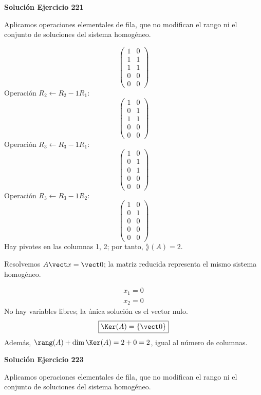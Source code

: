 \par\bigskip\noindent\textbf{Solución Ejercicio 221}\par\nobreak
Aplicamos operaciones elementales de fila, que no modifican el rango ni el conjunto de soluciones del sistema homogéneo.

\[
\begin{pmatrix}1&0\\1&1\\1&1\\0&0\\0&0\end{pmatrix}
\]
Operación $R_{2}\leftarrow R_{2}-1R_{1}$:
\[
\begin{pmatrix}1&0\\0&1\\1&1\\0&0\\0&0\end{pmatrix}
\]
Operación $R_{3}\leftarrow R_{3}-1R_{1}$:
\[
\begin{pmatrix}1&0\\0&1\\0&1\\0&0\\0&0\end{pmatrix}
\]
Operación $R_{3}\leftarrow R_{3}-1R_{2}$:
\[
\begin{pmatrix}1&0\\0&1\\0&0\\0&0\\0&0\end{pmatrix}
\]
Hay pivotes en las columnas 1, 2; por tanto, $\boxed{\rang(A)=2}$.

Resolvemos $A\vect x=\vect0$; la matriz reducida representa el mismo sistema homogéneo.

\[
\begin{aligned}x_{1}=0\\x_{2}=0\end{aligned}
\]
No hay variables libres; la única solución es el vector nulo.
\[
\boxed{\Ker(A)=\{\vect0\}}
\]
Además, $\rang(A)+\dim\Ker(A)=2+0=2$, igual al número de columnas.


\par\bigskip\noindent\textbf{Solución Ejercicio 223}\par\nobreak
Aplicamos operaciones elementales de fila, que no modifican el rango ni el conjunto de soluciones del sistema homogéneo.

